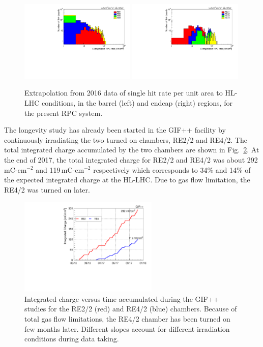 \begin{figure}[h]
\centering
\includegraphics[width=0.49\textwidth,keepaspectratio=true]{fig/wincc/longevity/Barrel-Roll-Rate-HL-LHC.pdf}
\includegraphics[width=0.49\textwidth,keepaspectratio=true]{fig/wincc/longevity/Endcap-Disks-Rate-HL-LHC.pdf}
\caption{Extrapolation from 2016 data of single hit rate per unit area to HL-LHC conditions, in the barrel (left) and endcap (right) regions, for the present RPC system.}
\label{fig:cms_rpc_extrapolated_rates}
\end{figure}

The longevity study has already been started in the GIF++ facility by continuously irradiating the two turned on chambers, RE2/2 and RE4/2. The total integrated charge accumulated by the two chambers are shown in Fig.~\ref{fig:gifpp_integrated_Q}. At the end of 2017, the total integrated charge for RE2/2 and RE4/2 was about 292\,mC-cm$^{-2}$ and 119\,mC-cm$^{-2}$ respectively which corresponds to 34\% and 14\% of the expected integrated charge at the HL-LHC. Due to gas flow limitation, the RE4/2 was turned on later.   
\begin{figure}[h]
\centering
\includegraphics[width=0.59\textwidth,keepaspectratio=true]{fig/wincc/longevity/GIFPP_Integrated_Charge.pdf}
\caption{Integrated charge versus time accumulated during the GIF++ studies for the RE2/2 (red) and RE4/2 (blue) chambers. Because of total gas flow limitations, the RE4/2 chamber has been turned on few months later. Different slopes account for different irradiation conditions during data taking.}
\label{fig:gifpp_integrated_Q}
\end{figure}

